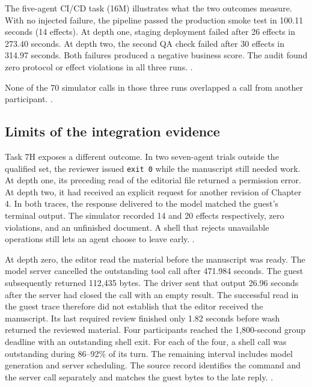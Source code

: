 \documentclass[10pt]{article}
\begin{document}
The five-agent CI/CD task (16M) illustrates what the two outcomes measure.
With no injected failure, the pipeline passed the production smoke test in
100.11 seconds (14 effects). At depth one, staging deployment failed after
26 effects in 273.40 seconds. At depth two, the second QA check failed after
30 effects in 314.97 seconds. Both failures produced a negative business
score. The audit found zero protocol or effect violations in all three runs.
.

None of the 70 simulator calls in those three runs overlapped a call from
another participant.
.

\subsection{Limits of the integration evidence}
Task 7H exposes a different outcome. In two seven-agent trials outside the
qualified set, the reviewer issued \texttt{exit 0} while the manuscript
still needed work. At depth one, its preceding read of the editorial file
returned a permission error. At depth two, it had received an explicit
request for another revision of Chapter 4. In both traces, the response
delivered to the model matched the guest's terminal output. The simulator
recorded 14 and 20 effects respectively, zero violations, and an unfinished
document. A shell that rejects unavailable operations still lets an agent
choose to leave early.
.

At depth zero, the editor read the material before the manuscript was ready.
The model server cancelled the outstanding tool call after 471.984 seconds.
The guest subsequently returned 112,435 bytes. The driver sent that output
26.96 seconds after the server had closed the call with an empty result.
The successful read in the guest trace therefore did not establish that the
editor received the manuscript. Its last required review finished only
1.82 seconds before wash returned the reviewed material. Four participants
reached the 1,800-second group deadline with an outstanding shell exit. For
each of the four, a shell call was outstanding during 86--92\% of its turn.
The remaining interval includes model generation and server scheduling.
The source record identifies the command and the server call separately and
matches the guest bytes to the late reply.
.
\end{document}
